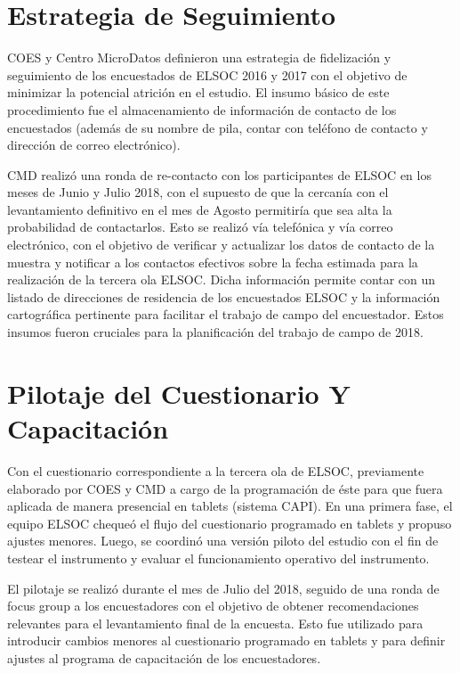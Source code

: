 \documentclass[
  openany]{book}
\begin{document}
\hypertarget{estrategia-de-seguimiento}{%
\section{Estrategia de Seguimiento}\label{estrategia-de-seguimiento}}

COES y Centro MicroDatos definieron una estrategia de fidelización y seguimiento de los encuestados de ELSOC 2016 y 2017 con el objetivo de minimizar la potencial atrición en el estudio. El insumo básico de este procedimiento fue el almacenamiento de información de contacto de los encuestados (además de su nombre de pila, contar con teléfono de contacto y dirección de correo electrónico).

CMD realizó una ronda de re-contacto con los participantes de ELSOC en los meses de Junio y Julio 2018, con el supuesto de que la cercanía con el levantamiento definitivo en el mes de Agosto permitiría que sea alta la probabilidad de contactarlos. Esto se realizó vía telefónica y vía correo electrónico, con el objetivo de verificar y actualizar los datos de contacto de la muestra y notificar a los contactos efectivos sobre la fecha estimada para la realización de la tercera ola ELSOC. Dicha información permite contar con un listado de direcciones de residencia de los encuestados ELSOC y la información cartográfica pertinente para facilitar el trabajo de campo del encuestador. Estos insumos fueron cruciales para la planificación del trabajo de campo de 2018.

\hypertarget{pilotaje-del-cuestionario-y-capacitaciuxf3n}{%
\section{Pilotaje del Cuestionario Y Capacitación}\label{pilotaje-del-cuestionario-y-capacitaciuxf3n}}

Con el cuestionario correspondiente a la tercera ola de ELSOC, previamente elaborado por COES y CMD a cargo de la programación de éste para que fuera aplicada de manera presencial en tablets (sistema CAPI). En una primera fase, el equipo ELSOC chequeó el flujo del cuestionario programado en tablets y propuso ajustes menores. Luego, se coordinó una versión piloto del estudio con el fin de testear el instrumento y evaluar el funcionamiento operativo del instrumento.

El pilotaje se realizó durante el mes de Julio del 2018, seguido de una ronda de focus group a los encuestadores con el objetivo de obtener recomendaciones relevantes para el levantamiento final de la encuesta. Esto fue utilizado para introducir cambios menores al cuestionario programado en tablets y para definir ajustes al programa de capacitación de los encuestadores.
\end{document}

